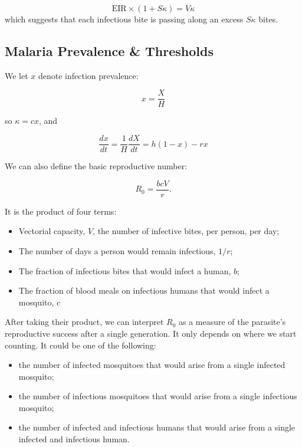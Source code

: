 \documentclass[
]{book}
\begin{document}
\[\mbox{EIR}\times (1 + S \kappa) = V \kappa\]
which suggests that each infectious bite is passing along an excess \(S\kappa\) bites.

\subsection{Malaria Prevalence \& Thresholds}\label{malaria-prevalence-thresholds}

We let \(x\) denote infection prevalence:

\begin{equation}
x = \frac{X}{H} 
\end{equation}

so \(\kappa = c x\), and

\begin{equation}
\frac{dx}{dt} = \frac{1}{H} \frac{dX}{dt} = h (1-x)-r x
\end{equation}

We can also define the basic reproductive number:

\begin{equation}
R_0 = \frac{bcV}{r}.
\end{equation}

It is the product of four terms:

\begin{itemize}
\item
  Vectorial capacity, \(V\), the number of infective bites, per person, per day;
\item
  The number of days a person would remain infectious, \(1/r\);
\item
  The fraction of infectious bites that would infect a human, \(b\);
\item
  The fraction of blood meals on infectious humans that would infect a mosquito, \(c\)
\end{itemize}

After taking their product, we can interpret \(R_0\) as a measure of the parasite's reproductive success after a single generation. It only depends on where we start counting. It could be one of the following:

\begin{itemize}
\item
  the number of infected mosquitoes that would arise from a single infected mosquito;
\item
  the number of infectious mosquitoes that would arise from a single infectious mosquito;
\item
  the number of infected and infectious humans that would arise from a single infected and infectious human.
\end{itemize}
\end{document}
